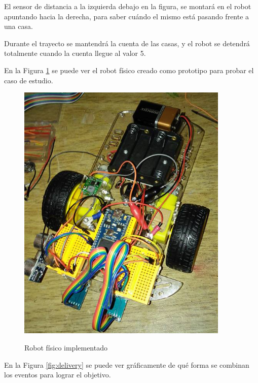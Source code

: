   El sensor de distancia a la izquierda debajo en la figura, se montará
en el robot apuntando hacia la derecha, para saber cuándo el mismo
está pasando frente a una casa.

  Durante el trayecto se mantendrá la cuenta de las casas, y el robot
se detendrá totalmente cuando la cuenta llegue al valor 5.

  En la Figura \ref{fig:robotfisico} se puede ver el
robot físico creado como prototipo para probar el caso de estudio.

\begin{figure}[hbtp]
\begin{center}
\caption{Robot físico implementado}
\includegraphics[width=0.9\textwidth]{graphs/alf.jpg}
\label{fig:robotfisico}
\end{center}
\end{figure}


  En la Figura \ref{fig:delivery} se puede ver gráficamente de qué forma
se combinan los eventos para lograr el objetivo.

